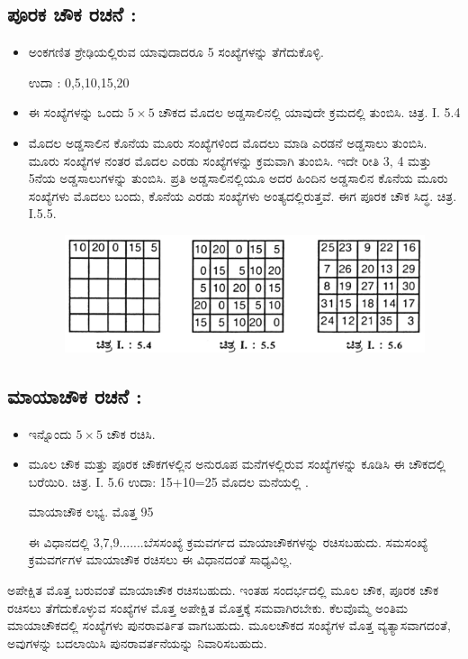 \subsection{ಪೂರಕ ಚೌಕ ರಚನೆ :}

\begin{itemize}
	\item ಅಂಕಗಣಿತ ಶ್ರೇಢಿಯಲ್ಲಿರುವ ಯಾವುದಾದರೂ 5 ಸಂಖ್ಯೆಗಳನ್ನು ತೆಗೆದುಕೊಳ್ಳಿ.

	ಉದಾ : 0,5,10,15,20
	\item ಈ ಸಂಖ್ಯೆಗಳನ್ನು ಒಂದು $5 \times 5$ ಚೌಕದ ಮೊದಲ ಅಡ್ಡಸಾಲಿನಲ್ಲಿ ಯಾವುದೇ ಕ್ರಮದಲ್ಲಿ ತುಂಬಿಸಿ. ಚಿತ್ರ. I. 5.4
	\item ಮೊದಲ ಅಡ್ಡಸಾಲಿನ ಕೊನೆಯ ಮೂರು ಸಂಖ್ಯೆಗಳಿಂದ ಮೊದಲು ಮಾಡಿ ಎರಡನೆ ಅಡ್ಡಸಾಲು ತುಂಬಿಸಿ. ಮೂರು ಸಂಖ್ಯೆಗಳ ನಂತರ ಮೊದಲ ಎರಡು ಸಂಖ್ಯೆಗಳನ್ನು ಕ್ರಮವಾಗಿ ತುಂಬಿಸಿ. ಇದೇ ರೀತಿ 3, 4 ಮತ್ತು 5ನೆಯ ಅಡ್ಡಸಾಲುಗಳನ್ನು ತುಂಬಿಸಿ. ಪ್ರತಿ ಅಡ್ಡಸಾಲಿನಲ್ಲಿಯೂ ಅದರ ಹಿಂದಿನ ಅಡ್ಡಸಾಲಿನ ಕೊನೆಯ ಮೂರು ಸಂಖ್ಯೆಗಳು ಮೊದಲು ಬಂದು, ಕೊನೆಯ ಎರಡು ಸಂಖ್ಯೆಗಳು ಅಂತ್ಯದಲ್ಲಿರುತ್ತವೆ. ಈಗ ಪೂರಕ ಚೌಕ ಸಿದ್ಧ. ಚಿತ್ರ. I.5.5.
	\begin{figure}[h]
	\includegraphics{src/figures/chap3/fig3.12.jpg}
	\end{figure}
\end{itemize}
\subsection{ಮಾಯಾಚೌಕ ರಚನೆ :}

\begin{itemize}
	\item ಇನ್ನೊಂದು $5 \times 5$ ಚೌಕ ರಚಿಸಿ.
	\item ಮೂಲ ಚೌಕ ಮತ್ತು ಪೂರಕ ಚೌಕಗಳಲ್ಲಿನ ಅನುರೂಪ ಮನೆಗಳಲ್ಲಿರುವ ಸಂಖ್ಯೆಗಳನ್ನು ಕೂಡಿಸಿ ಈ ಚೌಕದಲ್ಲಿ ಬರೆಯಿರಿ. ಚಿತ್ರ. I. 5.6
	ಉದಾ: 15+10=25 ಮೊದಲ ಮನೆಯಲ್ಲಿ .

	ಮಾಯಾಚೌಕ ಲಭ್ಯ. ಮೊತ್ತ 95

	ಈ ವಿಧಾನದಲ್ಲಿ 3,7,9.......ಬೆಸಸಂಖ್ಯೆ ಕ್ರಮವರ್ಗದ ಮಾಯಾಚೌಕಗಳನ್ನು ರಚಿಸಬಹುದು. ಸಮಸಂಖ್ಯೆ ಕ್ರಮವರ್ಗಗಳ ಮಾಯಾಚೌಕ ರಚಿಸಲು ಈ ವಿಧಾನದಂತೆ ಸಾಧ್ಯವಿಲ್ಲ.
\end{itemize}

ಅಪೇಕ್ಷಿತ ಮೊತ್ತ ಬರುವಂತೆ ಮಾಯಾಚೌಕ ರಚಿಸಬಹುದು. ಇಂತಹ ಸಂದರ್ಭದಲ್ಲಿ ಮೂಲ ಚೌಕ, ಪೂರಕ ಚೌಕ ರಚಿಸಲು ತೆಗೆದುಕೊಳ್ಳುವ ಸಂಖ್ಯೆಗಳ ಮೊತ್ತ ಅಪೇಕ್ಷಿತ ಮೊತ್ತಕ್ಕೆ ಸಮವಾಗಿರಬೇಕು. ಕೆಲವೊಮ್ಮೆ ಅಂತಿಮ ಮಾಯಾಚೌಕದಲ್ಲಿ ಸಂಖ್ಯೆಗಳು ಪುನರಾವರ್ತಿತ ವಾಗಬಹುದು. ಮೂಲಚೌಕದ ಸಂಖ್ಯೆಗಳ ಮೊತ್ತ ವ್ಯತ್ಯಾಸವಾಗದಂತೆ, ಅವುಗಳನ್ನು ಬದಲಾಯಿಸಿ ಪುನರಾವರ್ತನೆಯನ್ನು ನಿವಾರಿಸಬಹುದು.

